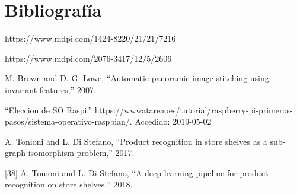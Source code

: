 \chapter{Bibliografía}

\begin{justify}

\noindent https://www.mdpi.com/1424-8220/21/21/7216

\noindent https://www.mdpi.com/2076-3417/12/5/2606

\noindent [34] M. Brown and D. G. Lowe, “Automatic panoramic image stitching using invariant features,” 2007.

\noindent [40] “Eleccion de SO Raspi.” https://wwwatareaoes/tutorial/raspberry-pi-primeros-pasos/sistema-operativo-raspbian/. Accedido: 2019-05-02

\noindent [37] A. Tonioni and L. Di Stefano, “Product recognition in store shelves as a sub-graph isomorphism problem,” 2017.

[38] A. Tonioni and L. Di Stefano, “A deep learning pipeline for product recognition on store shelves,” 2018.

\end{justify}